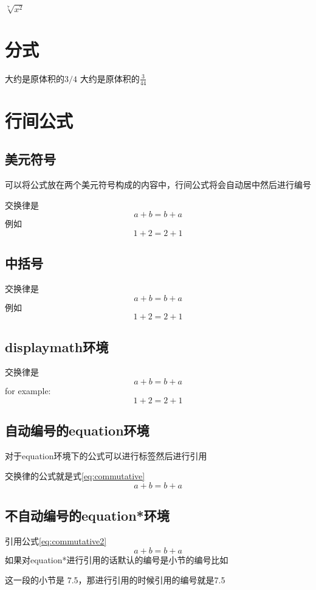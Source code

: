\documentclass{ctexart}
\begin{document}
    $\sqrt[7]{x^2}$
    \section{分式}
    大约是原体积的$3/4$
    大约是原体积的$\frac{3}{44}$
    \section{行间公式}
    \subsection{美元符号}
    可以将公式放在两个美元符号构成的内容中，行间公式将会自动居中然后进行编号

    交换律是$$a+b=b+a$$例如$$1+2=2+1$$
    \subsection{中括号}
    交换律是\[a+b=b+a\]例如\[1+2=2+1\]
    \subsection{displaymath环境}
    交换律是
    \begin{displaymath}
        a+b=b+a
    \end{displaymath}
    for example:
    \begin{displaymath}
        1+2=2+1
    \end{displaymath}
    \subsection{自动编号的equation环境}
    对于equation环境下的公式可以进行标签然后进行引用

    交换律的公式就是式\ref{eq:commutative}
    \begin{equation}
        \label{eq:commutative}
        a+b=b+a
    \end{equation}
    \subsection{不自动编号的equation*环境}
    引用公式\ref{eq:commutative2}
    \begin{equation*}\label{eq:commutative2}
        a+b=b+a
    \end{equation*}
    如果对equation*进行引用的话默认的编号是小节的编号比如

    这一段的小节是 7.5，那进行引用的时候引用的编号就是7.5
\end{document}
